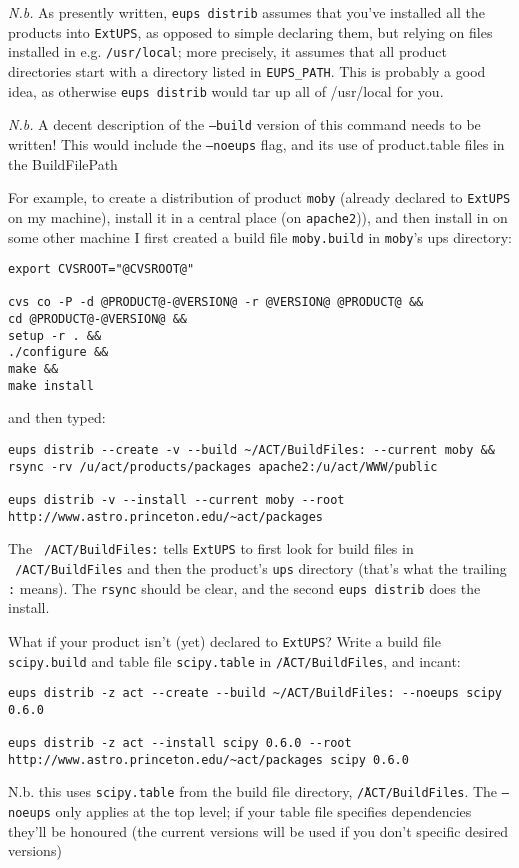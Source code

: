 \documentclass{article}
\newcommand{\code}[1]{\texttt{#1}}
\newcommand{\eups}{\code{ExtUPS}}
\begin{document}
\begin{itemize}
\textit{N.b.} As presently written, \code{eups distrib} assumes that you've
installed all the products into \eups, as opposed to simple declaring them, but
relying on files installed in e.g. \code{/usr/local}; more precisely, it assumes
that all product directories start with a directory listed in \code{EUPS\_PATH}.
This is probably a good idea, as otherwise \code{eups distrib} would tar up
all of /usr/local for you.

\textit{N.b.} A decent description of the \code{--build} version of this command
needs to be written!  This would include the \code{--noeups} flag, and its use
of product.table files in the BuildFilePath

For example, to create a distribution of product \code{moby} (already declared
to \eups{} on my machine), install it in a central place (on \code{apache2})),
and then install in on some other machine I first created a build file
\code{moby.build} in \code{moby}'s ups directory:
\begin{verbatim}
export CVSROOT="@CVSROOT@"

cvs co -P -d @PRODUCT@-@VERSION@ -r @VERSION@ @PRODUCT@ &&
cd @PRODUCT@-@VERSION@ &&
setup -r . &&
./configure &&
make &&
make install
\end{verbatim}
and then typed:
\begin{verbatim}
eups distrib --create -v --build ~/ACT/BuildFiles: --current moby &&
rsync -rv /u/act/products/packages apache2:/u/act/WWW/public

eups distrib -v --install --current moby --root http://www.astro.princeton.edu/~act/packages
\end{verbatim}
The \code{~/ACT/BuildFiles:} tells \eups{} to first look for build files
in \code{~/ACT/BuildFiles} and then the product's \code{ups} directory (that's what
the trailing \code{:} means). The \code{rsync} should be clear, and the second
\code{eups distrib} does the install.

What if your product isn't (yet) declared to \eups?  Write a build file \code{scipy.build} and
table file \code{scipy.table} in \code{\~/ACT/BuildFiles}, and incant:
\begin{verbatim}
eups distrib -z act --create --build ~/ACT/BuildFiles: --noeups scipy 0.6.0

eups distrib -z act --install scipy 0.6.0 --root http://www.astro.princeton.edu/~act/packages scipy 0.6.0
\end{verbatim}
N.b. this uses \code{scipy.table} from the build file directory, \code{\~/ACT/BuildFiles}. The
\code{--noeups} only applies at the top level;  if your table file specifies dependencies
they'll be honoured (the current versions will be used if you don't specific desired versions)


\end{itemize}
\end{document}
